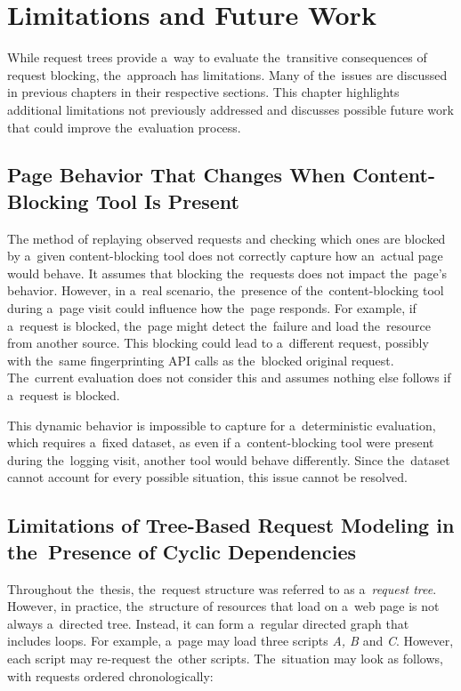 \chapter{Limitations and Future Work}
\label{limitations-chapter}
While request trees provide a~way to evaluate the~transitive consequences of request blocking, the~approach has limitations. Many of the~issues are discussed in previous chapters in their respective sections. This chapter highlights additional limitations not previously addressed and discusses possible future work that could improve the~evaluation process.

\section{Page Behavior That Changes When Content-Blocking Tool Is Present}
\label{page-behavior-unknown}
The method of replaying observed requests and checking which ones are blocked by a~given content-blocking tool does not correctly capture how an~actual page would behave. It assumes that blocking the~requests does not impact the~page's behavior. However, in a~real scenario, the~presence of the~content-blocking tool during a~page visit could influence how the~page responds. For example, if a~request is blocked, the~page might detect the~failure and load the~resource from another source. This blocking could lead to a~different request, possibly with the~same fingerprinting API calls as the~blocked original request. The~current evaluation does not consider this and assumes nothing else follows if a~request is blocked.

This dynamic behavior is impossible to capture for a~deterministic evaluation,  which requires a~fixed dataset, as even if a~content-blocking tool were present during the~logging visit, another tool would behave differently. Since the~dataset cannot account for every possible situation, this issue cannot be resolved.


\section{Limitations of Tree-Based Request Modeling in the~Presence of Cyclic Dependencies}
\label{request_tree_issues}
Throughout the~thesis, the~request structure was referred to as a~\emph{request tree}. However, in practice, the~structure of resources that load on a~web page is not always a~directed tree. Instead, it can form a~regular directed graph that includes loops. For example, a~page may load three scripts \emph{A, B} and \emph{C}. However, each script may re-request the~other scripts. The~situation may look as follows, with requests ordered chronologically:

